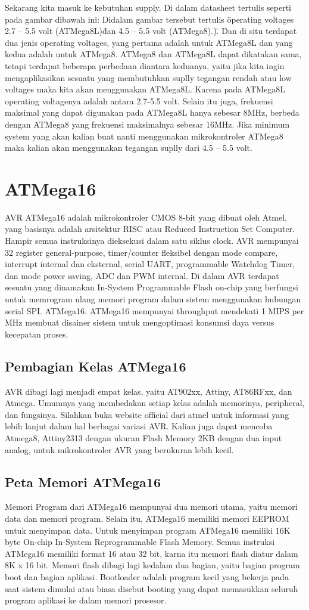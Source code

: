 		Sekarang kita masuk ke kebutuhan supply. Di dalam datasheet tertulis seperti pada gambar dibawah ini:
		Didalam gambar tersebut tertulis \"operating voltages 2.7 – 5.5 volt (ATMega8L)\" dan \"4.5 – 5.5 volt (ATMega8).)\". Dan di situ terdapat dua jenis operating voltages, yang pertama adalah untuk ATMega8L dan  yang kedua adalah untuk ATMega8. ATMega8 dan ATMega8L dapat dikatakan sama, tetapi terdapat beberapa perbedaan diantara keduanya, yaitu  jika kita ingin mengaplikasikan sesuatu yang membutuhkan suplly tegangan rendah atau low voltages maka kita akan menggunakan ATMega8L. Karena pada ATMega8L operating voltagenya adalah antara 2.7-5.5 volt.
		Selain itu juga, frekuensi maksimal yang dapat digunakan pada ATMega8L hanya sebesar 8MHz, berbeda dengan ATMega8 yang frekuensi maksimalnya sebesar 16MHz. Jika minimum system yang akan kalian buat nanti menggunakan mikrokontroler ATMega8 maka kalian akan menggunakan tegangan suplly dari 4.5 – 5.5 volt.

\section{ATMega16}
		AVR ATMega16 adalah mikrokontroler CMOS 8-bit yang dibuat oleh Atmel, yang basisnya adalah arsitektur RISC atau Reduced Instruction Set Computer. Hampir semua instruksinya dieksekusi dalam satu siklus clock. AVR mempunyai 32 register general-purpose, timer/counter fleksibel dengan mode compare, interrupt internal dan eksternal, serial UART, programmable Watchdog Timer, dan mode power saving, ADC dan PWM internal. Di dalam AVR terdapat sesuatu yang dinamakan In-System Programmable Flash on-chip yang berfungsi untuk memrogram ulang memori program dalam sistem menggunakan hubungan serial SPI. ATMega16. ATMega16 mempunyai throughput mendekati 1 MIPS per MHz membuat disainer sistem untuk mengoptimasi konsumsi daya versus kecepatan proses.
	\subsection{Pembagian Kelas ATMega16}
		AVR dibagi lagi menjadi empat kelas, yaitu AT902xx, Attiny, AT86RFxx, dan Atmega. Umumnya yang membedakan setiap kelas adalah memorinya, peripheral, dan fungsinya. Silahkan buka website official dari atmel  untuk informasi yang lebih lanjut dalam hal berbagai variasi AVR. Kalian juga dapat mencoba Atmega8, Attiny2313 dengan ukuran Flash Memory 2KB dengan dua input analog, untuk mikrokontroler AVR yang berukuran lebih kecil.
	\subsection{Peta Memori ATMega16}
		Memori Program dari ATMega16 mempunyai dua memori utama, yaitu memori data dan memori program. Selain itu, ATMega16 memiliki memori EEPROM untuk menyimpan data. Untuk menyimpan program ATMega16 memiliki 16K byte On-chip In-System Reprogrammable Flash Memory. Semua instruksi ATMega16 memiliki format 16 atau 32 bit, karna itu memori flash diatur dalam 8K x 16 bit. Memori flash dibagi lagi kedalam dua bagian, yaitu bagian program boot dan bagian aplikasi. Bootloader adalah program kecil yang bekerja pada saat sistem dimulai atau biasa disebut booting yang dapat memasukkan seluruh program aplikasi ke dalam memori prosesor.
